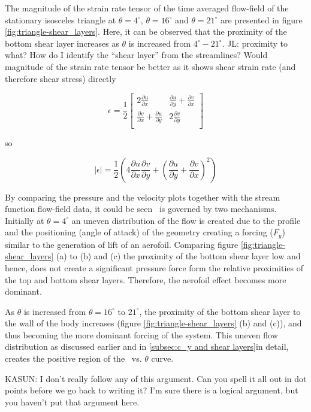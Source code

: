 



The magnitude of the strain rate tensor of the time averaged flow-field of the stationary isosceles triangle at  $\theta=4^{\circ}$, $\theta=16^{\circ}$ and $\theta=21^{\circ}$ are presented in figure \ref{fig:triangle-shear_layers}. Here, it can be observed that the proximity of the bottom shear layer increases as $\theta$ is increased from $4^{\circ}-21^{\circ}$. JL: proximity to what? How do I identify the ``shear layer'' from the streamlines? Would magnitude of the strain rate tensor be better as it shows shear strain rate (and therefore shear stress) directly

\begin{equation}
\epsilon = \frac{1}{2}
\begin{bmatrix}
  2\frac{\partial u}{\partial x} & \frac{\partial u}{\partial y} + \frac{\partial v}{\partial x} \\
  \frac{\partial v}{\partial x} + \frac{\partial u}{\partial y} & 2\frac{\partial v}{\partial y} \\
\end{bmatrix}
\end{equation}

so

\begin{equation}
  |\epsilon| = \frac{1}{2}\left(4\frac{\partial u}{\partial x}\frac{\partial v}{\partial y} + \left(\frac{\partial u}{\partial y} + \frac{\partial v}{\partial x}\right)^2\right)
\end{equation}

By comparing the pressure and the velocity plots together with the stream function flow-field data, it could be seen \cy\ is governed by two mechanisms. Initially at $\theta= 4^{\circ}$ an uneven distribution of the flow is created due to the profile and the positioning (angle of attack) of the geometry creating a forcing ($F_{y}$) similar to the generation of lift of an aerofoil. Comparing figure \ref{fig:triangle-shear_layers} (a) to (b) and (c) the proximity of the bottom shear layer low and hence, does not create a significant pressure force form the relative proximities of the top and bottom shear layers. Therefore, the aerofoil effect becomes more dominant.  

As $\theta$ is increased from $\theta=16^{\circ}$ to $21^{\circ}$, the proximity of the bottom shear layer to the wall of the body increases (figure \ref{fig:triangle-shear_layers} (b) and (c)), and thus becoming the more dominant forcing of the system. This uneven flow distribution as discussed earlier and in \ref{subsec:c_y and shear layers}in detail, creates the positive region of the \cy\ vs. $\theta$ curve.

KASUN: I don't really follow any of this argument. Can you spell it all out in dot points before we go back to writing it? I'm sure there is a logical argument, but you haven't put that argument here.
 
 
 
 
 



